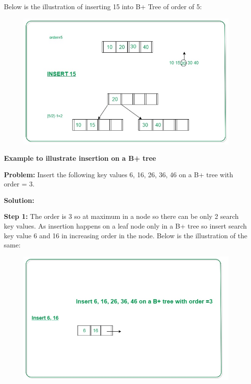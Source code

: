 \documentclass[11pt, a4paper]{article}
\begin{document}
\noindent Below is the illustration of inserting 15 into B+ Tree of order of 5:

\begin{figure}[h]
    \centering
    \includegraphics[scale=0.4]{in2.jpeg}
    \label{in2}
\end{figure}

\noindent \large {\textbf{Example to illustrate insertion on a B+ tree}} \vspace{0.5cm}

\noindent \textbf{Problem:} Insert the following key values 6, 16, 26, 36, 46 on a B+ tree with order = 3.

\noindent \textbf{Solution:} \vspace{2cm}

\noindent \textbf{Step 1:} The order is 3 so at maximum in a node so there can be only 2 search key values. As insertion happens on a leaf node only in a B+ tree so insert search key value 6 and 16 in increasing order in the node. Below is the illustration of the same:

\begin{figure}[h]
    \centering
    \includegraphics[scale=0.4]{in3.jpeg}
    \label{in3}
\end{figure}
\end{document}
